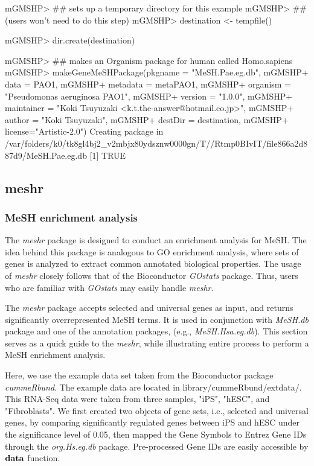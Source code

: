 \documentclass[11pt]{article}
\newcommand{\Rpackage}[1]{{\textit{#1}}}
\begin{document}
\begin{center}
\begin{Schunk}
\begin{Soutput}
mGMSHP> ## sets up a temporary directory for this example
mGMSHP> ## (users won't need to do this step)
mGMSHP> destination <- tempfile()

mGMSHP> dir.create(destination)

mGMSHP> ## makes an Organism package for human called Homo.sapiens
mGMSHP> makeGeneMeSHPackage(pkgname = "MeSH.Pae.eg.db",
mGMSHP+ 					data = PAO1,
mGMSHP+           metadata = metaPAO1,
mGMSHP+ 					organism = "Pseudomonas aeruginosa PAO1",
mGMSHP+ 					version = "1.0.0",
mGMSHP+ 					maintainer = "Koki Tsuyuzaki <k.t.the-answer@hotmail.co.jp>",
mGMSHP+ 					author = "Koki Tsuyuzaki",
mGMSHP+ 					destDir = destination,
mGMSHP+ 					license="Artistic-2.0")
Creating package in /var/folders/k0/tk8gl4bj2_v2mbjx80ydsznw0000gn/T//Rtmp0BIvIT/file866a2d887d9/MeSH.Pae.eg.db 
[1] TRUE
\end{Soutput}
\end{Schunk}
\end{center}

\clearpage
\subsection{meshr}
\subsubsection{MeSH enrichment analysis}
The \Rpackage{meshr} package is designed to conduct an enrichment analysis for MeSH.  The idea behind this package is analogous to GO enrichment analysis, where sets of genes is analyzed to extract common annotated biological properties. The usage of \Rpackage{meshr} closely follows that of the Bioconductor \Rpackage{GOstats} package. Thus, users who are familiar with \Rpackage{GOstats} may easily handle \Rpackage{meshr}.

The \Rpackage{meshr} package accepts selected and universal genes as input, and returns significantly overrepresented MeSH terms. It is used in conjunction with \Rpackage{MeSH.db} package and one of the annotation packages, (e.g., \Rpackage{MeSH.Hsa.eg.db}). This section serves as a quick guide to the \Rpackage{meshr}, while illustrating entire process to perform a MeSH enrichment analysis.

Here, we use the example data set taken from the Bioconductor package \Rpackage{cummeRbund}. The example data are located in library/cummeRbund/extdata/. This RNA-Seq data were taken from three samples, "iPS", "hESC", and  "Fibroblasts".
We first created two objects of gene sets, i.e., selected and universal genes,
by comparing significantly regulated genes between iPS and hESC under the significance level of 0.05, then mapped the Gene Symbols to Entrez Gene IDs through the \Rpackage{org.Hs.eg.db} package. Pre-processed Gene IDs are easily accessible by $\bf{data}$ function.
\end{document}
